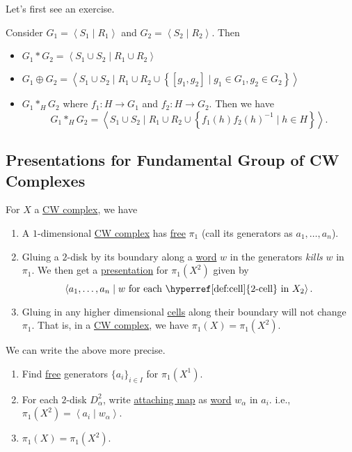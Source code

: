 Let's first see an exercise.
\begin{exercise}
	Consider \(G_1 = \left< S_1 \mid R_1 \right> \) and \(G_2 = \left< S_2 \mid R_2 \right> \). Then
	\begin{itemize}
		\item \(G_1\ast G_2 = \left< S_{1}\cup S_2  \mid R_1 \cup R_2 \right> \)
		\item \(G_1\oplus G_2 = \left< S_1 \cup S_2  \mid R_1 \cup R_2\cup \left\{[g_1, g_2] \mid g_1\in G_1, g_2\in G_2\right\} \right> \)
		\item \(G_1 \ast_H G_2 \) where \(f_1\colon H\to G_1\) and \(f_2\colon H\to G_2\). Then we have
		      \[
			      G_1\ast_H G_2 = \left< S_1 \cup S_2  \mid R_1 \cup  R_2\cup \left\{f_1(h)f_2(h)^{-1}  \mid h\in H\right\} \right>.
		      \]
	\end{itemize}
\end{exercise}

\subsection{Presentations for Fundamental Group of CW Complexes}
For \(X\) a \hyperref[def:CW-Complex]{CW complex}, we have
\begin{enumerate}
	\item A \(1\)-dimensional \hyperref[def:CW-Complex]{CW complex} has \hyperref[def:free-group]{free} \(\pi _1\) (call its generators as \(a_1, \ldots , a_n \)).
	\item Gluing a \(2\)-disk by its boundary along a \hyperref[def:word]{word} \(w\) in the generators \emph{kills} \(w\) in \(\pi _1\). We then get a
	      \hyperref[def:group-presentation]{presentation} for \(\pi _1(X^2)\) given by
	      \[
		      \left< a_1, \ldots , a_n \mid w \text{ for each \hyperref[def:cell]{\(2\)-cell} in \(X_2\)}\right>.
	      \]
	\item Gluing in any higher dimensional \hyperref[def:cell]{cells} along their boundary will not change \(\pi _1\). That is, in a \hyperref[def:CW-Complex]{CW complex},
	      we have \(\pi _1(X) = \pi _1(X^2)\).
\end{enumerate}

\begin{remark}
	We can write the above more precise.
	\begin{enumerate}
		\item Find \hyperref[def:free-group]{free} generators \(\{a _i\}_{i\in I}\) for \(\pi _1(X^1)\).
		\item For each \(2\)-disk \(D^2_\alpha \), write \hyperref[def:attaching-map]{attaching map} as \hyperref[def:word]{word} \(w_\alpha \) in \(a_{i}\). i.e.,
		      \(\pi _1(X^2) = \left< a_{i} \mid w_\alpha  \right>\).
		\item \(\pi_1(X) = \pi _1(X^2)\).
	\end{enumerate}
\end{remark}

